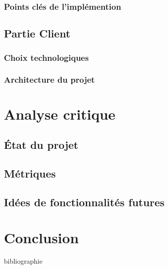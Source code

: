 \subsection{Points clés de l'implémention}


\section{Partie Client}
\subsection{Choix technologiques}
\subsection{Architecture du projet}


\chapter{Analyse critique}
\section{État du projet}
\section{Métriques} 
\section{Idées de fonctionnalités futures}

\chapter{Conclusion}

\backmatter

{bibliographie}

